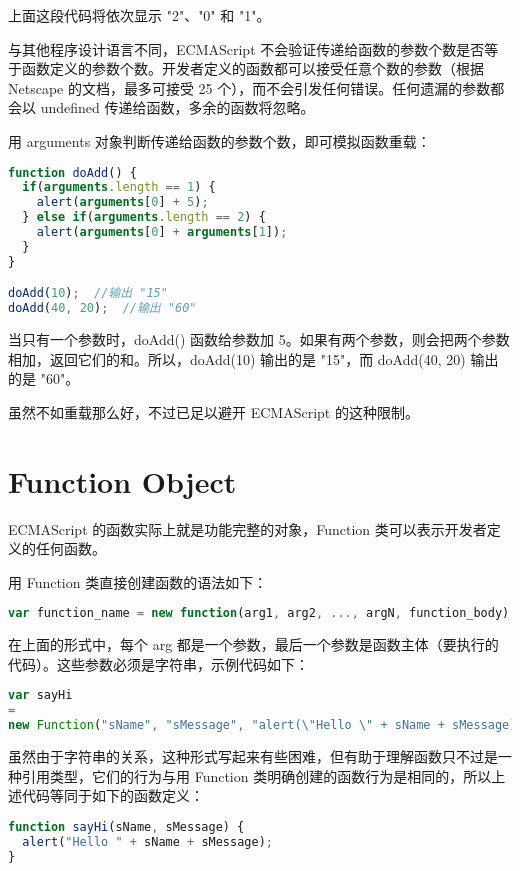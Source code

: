 上面这段代码将依次显示 "2"、"0" 和 "1"。

与其他程序设计语言不同，ECMAScript 不会验证传递给函数的参数个数是否等于函数定义的参数个数。开发者定义的函数都可以接受任意个数的参数（根据 Netscape 的文档，最多可接受 25 个），而不会引发任何错误。任何遗漏的参数都会以 undefined 传递给函数，多余的函数将忽略。


用 arguments 对象判断传递给函数的参数个数，即可模拟函数重载：


\begin{lstlisting}[language=JavaScript]
function doAdd() {
  if(arguments.length == 1) {
    alert(arguments[0] + 5);
  } else if(arguments.length == 2) {
    alert(arguments[0] + arguments[1]);
  }
}

doAdd(10);	//输出 "15"
doAdd(40, 20);	//输出 "60"
\end{lstlisting}


当只有一个参数时，doAdd() 函数给参数加 5。如果有两个参数，则会把两个参数相加，返回它们的和。所以，doAdd(10) 输出的是 "15"，而 doAdd(40, 20) 输出的是 "60"。

虽然不如重载那么好，不过已足以避开 ECMAScript 的这种限制。

\chapter{Function Object}



ECMAScript 的函数实际上就是功能完整的对象，Function 类可以表示开发者定义的任何函数。

用 Function 类直接创建函数的语法如下：

\begin{lstlisting}[language=JavaScript]
var function_name = new function(arg1, arg2, ..., argN, function_body)
\end{lstlisting}

在上面的形式中，每个 arg 都是一个参数，最后一个参数是函数主体（要执行的代码）。这些参数必须是字符串，示例代码如下：

\begin{lstlisting}[language=JavaScript]
var sayHi 
= 
new Function("sName", "sMessage", "alert(\"Hello \" + sName + sMessage);");
\end{lstlisting}

虽然由于字符串的关系，这种形式写起来有些困难，但有助于理解函数只不过是一种引用类型，它们的行为与用 Function 类明确创建的函数行为是相同的，所以上述代码等同于如下的函数定义：


\begin{lstlisting}[language=JavaScript]
function sayHi(sName, sMessage) {
  alert("Hello " + sName + sMessage);
}
\end{lstlisting}


